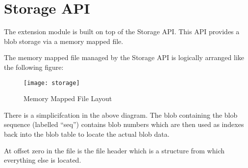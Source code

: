 %
%
%
\section{Storage API}

The  extension module is built on top of the Storage
API.  This API provides a blob storage via a memory mapped file.

The memory mapped file managed by the Storage API is logically
arranged like the following figure:

\begin{figure}[h]
\begin{center}
\texttt{[image: storage]}
\caption{Memory Mapped File Layout}
\end{center}
\end{figure}

There is a simplicifcation in the above diagram.  The blob containing
the blob sequence (labelled ``seq'') contains blob numbers which are
then used as indexes back into the blob table to locate the actual
blob data.

At offset zero in the file is the file header which is a
 structure from which everything else is located.

